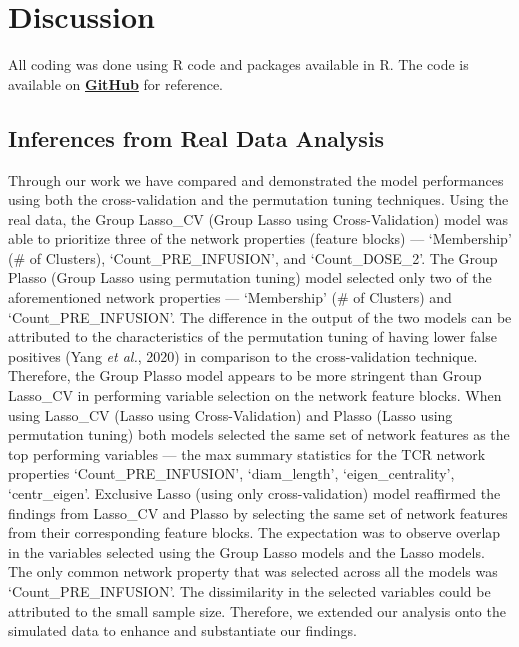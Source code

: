 \chapter{Discussion}
All coding was done using R code and packages available in R. The code is available on \href{https://github.com/ShilpikaB/Prioritizing-Network-Properties-of-T-Cell-Receptors}{\textbf{GitHub}} for reference.
\section{Inferences from Real Data Analysis}\label{sec:realdat_ana}
Through our work we have compared and demonstrated the model performances using both the cross-validation and the permutation tuning techniques. Using the real data, the Group Lasso\_CV (Group Lasso using Cross-Validation) model was able to prioritize three of the network properties (feature blocks)  --- \lq Membership' (\# of Clusters), \lq Count\_PRE\_INFUSION', and \lq Count\_DOSE\_2'. The Group Plasso (Group Lasso using permutation tuning) model selected only two of the aforementioned network properties --- \lq Membership' (\# of Clusters) and \lq Count\_PRE\_INFUSION'. The difference in the output of the two models can be attributed to the characteristics of the permutation tuning of having lower false positives (\cite{permassisttune}Yang \textit{et al.}, 2020) in comparison to the cross-validation technique. Therefore, the Group Plasso model appears to be more stringent than Group Lasso\_CV in performing variable selection on the network feature blocks. When using Lasso\_CV (Lasso using Cross-Validation) and Plasso (Lasso using permutation tuning) both models selected the same set of network features as the top performing variables --- the max summary statistics for the TCR network properties \lq Count\_PRE\_INFUSION', \lq diam\_length', \lq eigen\_centrality', \lq centr\_eigen'. Exclusive Lasso (using only cross-validation) model reaffirmed the findings from Lasso\_CV and Plasso by selecting the same set of network features from their corresponding feature blocks. The expectation was to observe overlap in the variables selected using the Group Lasso models and the Lasso models. The only common network property that was selected across all the models was \lq Count\_PRE\_INFUSION'. The dissimilarity in the selected variables could be attributed to the small sample size. Therefore, we extended our analysis onto the simulated data to enhance and substantiate our findings.\par

